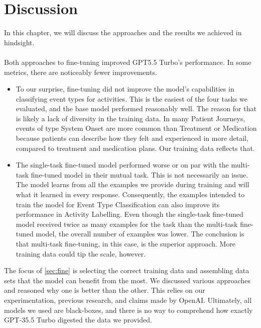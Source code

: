 \section{Discussion}\label{sec:discussion}
In this chapter, we will discuss the approaches and the results we achieved in hindsight.\\\\
Both approaches to fine-tuning improved GPT5.5 Turbo's performance. In some metrics, there are noticeably fewer improvements.\\
\begin{itemize}
    \item To our surprise, fine-tuning did not improve the model's capabilities in classifying event types for activities. This is the easiest of the four tasks we evaluated, and the base model performed reasonably well. The reason for that is likely a lack of diversity in the training data. In many Patient Journeys, events of type System Onset are more common than Treatment or Medication because patients can describe how they felt and experienced in more detail, compared to treatment and medication plans. Our training data reflects that.
    \item The single-task fine-tuned model performed worse or on par with the multi-task fine-tuned model in their mutual task. This is not necessarily an issue. The model learns from all the examples we provide during training and will what it learned in every response. Consequently, the examples intended to train the model for Event Type Classification can also improve its performance in Activity Labelling. Even though the single-task fine-tuned model received twice as many examples for the task  than the multi-task fine-tuned model, the overall number of examples was lower. The conclusion is that multi-task fine-tuning, in this case, is the superior approach. More training data could tip the scale, however.
\end{itemize}
The focus of \autoref{sec:fine} is selecting the correct training data and assembling data sets that the model can benefit from the most. We discussed various approaches and reasoned why one is better than the other. This relies on our experimentation, previous research, and claims made by OpenAI. Ultimately, all models we used are black-boxes, and there is no way to comprehend how exactly GPT-35.5 Turbo digested the data we provided.